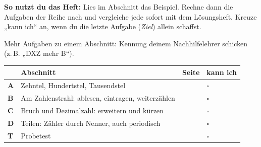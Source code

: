 \documentclass[11pt]{article}
\begin{document}
\par\smallskip
{}\par\medskip
\noindent\textbf{So nutzt du das Heft:} Lies im Abschnitt das Beispiel. Rechne dann die Aufgaben der Reihe nach und vergleiche jede sofort mit dem Lösungsheft. Kreuze „kann ich“ an, wenn du die letzte Aufgabe (\emph{Ziel}) allein schaffst.\par
\noindent Mehr Aufgaben zu einem Abschnitt: Kennung deinem Nachhilfelehrer schicken (z.\,B. „DXZ mehr B“).\par\medskip
{\renewcommand{\arraystretch}{1.3}
\noindent\begin{tabular}{|>{\bfseries}p{10mm}|p{112mm}|>{\raggedleft\arraybackslash}p{10mm}|>{\centering\arraybackslash}p{14mm}|}\hline
\rowcolor{black!8} & \textbf{Abschnitt} & \textbf{Seite} & \textbf{kann ich}\\\hline
A & Zehntel, Hundertstel, Tausendstel & \pageref{s:A} & $\square$\\\hline
B & Am Zahlenstrahl: ablesen, eintragen, weiterzählen & \pageref{s:B} & $\square$\\\hline
C & Bruch und Dezimalzahl: erweitern und kürzen & \pageref{s:C} & $\square$\\\hline
D & Teilen: Zähler durch Nenner, auch periodisch & \pageref{s:D} & $\square$\\\hline
T & Probetest & \pageref{s:T} & $\square$\\\hline
\end{tabular}}\par\bigskip
\end{document}
